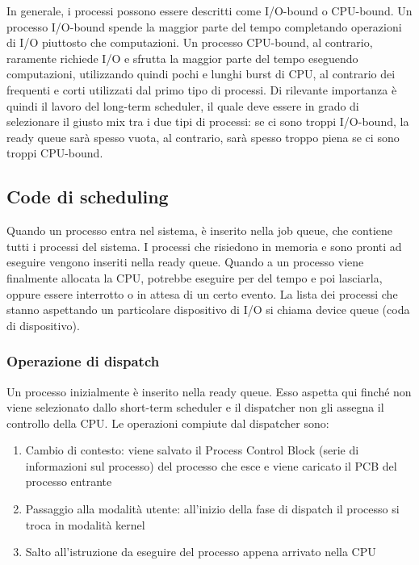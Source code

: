 \documentclass[a4paper]{article}
\begin{document}
In generale, i processi possono essere descritti come I/O-bound o CPU-bound. Un processo I/O-bound spende la maggior parte del tempo completando operazioni di I/O piuttosto che computazioni. Un processo CPU-bound, al contrario, raramente richiede I/O e sfrutta la maggior parte del tempo eseguendo computazioni, utilizzando quindi pochi e lunghi burst di CPU, al contrario dei frequenti e corti utilizzati dal primo tipo di processi. Di rilevante importanza è quindi il lavoro del long-term scheduler, il quale deve essere in grado di selezionare il giusto mix tra i due tipi di processi: se ci sono troppi I/O-bound, la ready queue sarà spesso vuota, al contrario, sarà spesso troppo piena se ci sono troppi CPU-bound.

\subsection{Code di scheduling}
Quando un processo entra nel sistema, è inserito nella job queue, che contiene tutti i processi del sistema. I processi che risiedono in memoria e sono pronti ad eseguire vengono inseriti nella ready queue. Quando a un processo viene finalmente allocata la CPU, potrebbe eseguire per del tempo e poi lasciarla, oppure essere interrotto o in attesa di un certo evento. La lista dei processi che stanno aspettando un particolare dispositivo di I/O si chiama device queue (coda di dispositivo).
\subsubsection{Operazione di dispatch}
Un processo inizialmente è inserito nella ready queue. Esso aspetta qui finché non viene selezionato dallo short-term scheduler e il dispatcher non gli assegna il controllo della CPU. Le operazioni compiute dal dispatcher sono:
\begin{enumerate}
    \item Cambio di contesto: viene salvato il Process Control Block (serie di informazioni sul processo) del processo che esce e viene caricato il PCB del processo entrante
    \item Passaggio alla modalità utente: all'inizio della fase di dispatch il processo si troca in modalità kernel
    \item Salto all'istruzione da eseguire del processo appena arrivato nella CPU
\end{enumerate}
\end{document}
